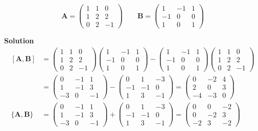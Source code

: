 \documentclass[12pt]{article}
\begin{document}
\vspace{10pt}

\[
\mathbf{A} =
\begin{pmatrix}
1 & 1 & 0 \\
1 & 2 & 2 \\
0 & 2 & -1
\end{pmatrix}
\qquad
\mathbf{B} =
\begin{pmatrix}
1 & -1 & 1 \\
-1 & 0 & 0 \\
1 & 0 & 1
\end{pmatrix}
\]

\vspace{10pt}
\textbf{Solution}
\[
\begin{split}
[\mathbf{A},\mathbf{B}] &= \begin{pmatrix}
1 & 1 & 0 \\
1 & 2 & 2 \\
0 & 2 & -1
\end{pmatrix}
\begin{pmatrix}
1 & -1 & 1 \\
-1 & 0 & 0 \\
1 & 0 & 1
\end{pmatrix} -
\begin{pmatrix}
1 & -1 & 1 \\
-1 & 0 & 0 \\
1 & 0 & 1
\end{pmatrix}
\begin{pmatrix}
1 & 1 & 0 \\
1 & 2 & 2 \\
0 & 2 & -1
\end{pmatrix} \\[2em]
& = \begin{pmatrix}
0 & -1 & 1 \\
1 & -1 & 3 \\
-3 & 0 & -1
\end{pmatrix} -
\begin{pmatrix}
0 & 1 & -3 \\
-1 & -1 & 0 \\
1 & 3 & -1
\end{pmatrix} = \begin{pmatrix}
0 & -2 & 4 \\
2 & 0 & 3 \\
-4 & -3 & 0
\end{pmatrix} \\[3em]
\{\mathbf{A},\mathbf{B}\} &= \begin{pmatrix}
0 & -1 & 1 \\
1 & -1 & 3 \\
-3 & 0 & -1
\end{pmatrix} +
\begin{pmatrix}
0 & 1 & -3 \\
-1 & -1 & 0 \\
1 & 3 & -1
\end{pmatrix} = \begin{pmatrix}
0 & 0 & -2 \\
0 & -2 & 3 \\
-2 & 3 & -2
\end{pmatrix}
\end{split}
\]
\end{document}
